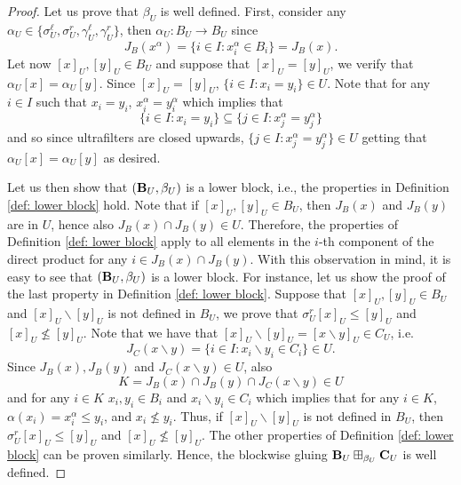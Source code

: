 \documentclass{amsart}
\theoremstyle{definition}
\numberwithin{equation}{section}
\newcommand{\alg}[1]{{\textbf{\upshape #1}}}  %
\newcommand{\sell}{\sigma^\ell}
\newcommand{\sr}{\sigma^r}
\newcommand{\gell}{\gamma^\ell}
\newcommand{\gr}{\gamma^r}
\begin{document}
\begin{proof}
 Let us prove that $\beta_U$ is well defined. First, consider any $\alpha_U \in \{\sell_U, \sr_U, \gell_U, \gr_U \}$, then $\alpha_U: B_U \to B_U$ since 
 $$J_B(x^\alpha)=\{ i \in I : x^\alpha_i \in B_i \}=J_B(x).$$
  Let now $[x]_U, [y]_U \in B_U$ and suppose that $[x]_U=[y]_U$, we verify that $\alpha_U[x]=\alpha_U[y]$. Since $[x]_U=[y]_U$, $\{i \in I : x_i=y_i \} \in U$. Note that for any $i \in I$ such that $x_i=y_i$, $x^\alpha_i=y^\alpha_i$ which implies that 
  $$\{i \in I : x_i = y_i \} \subseteq \{ j \in I : x^\alpha_j=y^\alpha_j \}$$ and so since ultrafilters are closed upwards, $\{ j \in I : x^\alpha_j=y^\alpha_j \} \in U$ getting that $\alpha_U[x]=\alpha_U[y]$ as desired.
  
Let us then show that $(\alg B_U, \beta_U)$ is a lower block, i.e., the properties in Definition \ref{def: lower block} hold. Note that if $[x]_U, [y]_U \in B_U$, then $J_B(x)$ and $J_B(y)$ are in $U$, hence also $J_B(x)\cap J_B(y) \in U$. Therefore, the properties of Definition \ref{def: lower block} apply to all elements in the $i$-th component of the direct product for any $i \in J_B(x)\cap J_B(y)$. With this observation in mind, it is easy to see that $(\alg B_U, \beta_U)$ is a lower block. For instance, let us show the proof of the last property in Definition \ref{def: lower block}. Suppose that $[x]_U, [y]_U \in B_U$ and $[x]_U \backslash [y]_U$ is not defined in $B_U$, we prove that $\sr_U[x]_U\leq [y]_U$ and $[x]_U \not \leq [y]_U$. Note that we have that $[x]_U \backslash [y]_U=[x\backslash y ]_U \in C_U$, i.e. 
$$J_C(x \backslash y)=\{ i \in I : x_i \backslash y_i \in C_i \} \in U.$$ Since $J_B(x), J_B(y)$ and $J_C(x \backslash y) \in U$, also $$K=J_B(x)\cap J_B(y)\cap J_C(x \backslash y) \in U$$ and for any $i \in K$ $x_i, y_i \in B_i $ and $x_i \backslash y_i \in C_i$ which implies that for any $i \in K$, $\alpha(x_i) = x_i^\alpha\leq y_i$, and $x_i \not \leq y_i$. Thus, if $[x]_U\backslash [y]_U$ is not defined in $B_U$, then $\sr_U[x]_U\leq [y]_U$ and $[x]_U \not \leq [y]_U$. The other properties of Definition \ref{def: lower block} can be proven similarly. Hence, the blockwise gluing $\alg B_U \boxplus_{\beta_U} \alg C_U$ is well defined. 


\end{proof}
\end{document}
